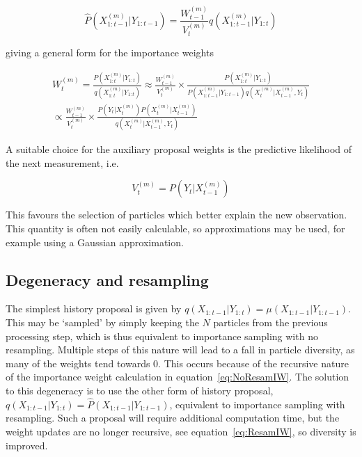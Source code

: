 \begin{equation}
\hat{P}(X_{1:t-1}^{(m)}|Y_{1:t-1}) = \frac{W_{t-1}^{(m)}}{V_t^{(m)}} q(X_{1:t-1}^{(m)}|Y_{1:t})
\label{eq:}
\end{equation}

giving a general form for the importance weights

\begin{multline}
W_t^{(m)} = \frac{P(X_{1:t}^{(m)}|Y_{1:t})}{q(X_{1:t}^{(m)}|Y_{1:t})}
\approx \frac{W_{t-1}^{(m)}}{V_{t}^{(m)}} \times \frac{P(X_{1:t}^{(m)}|Y_{1:t})}{P(X_{1:t-1}^{(m)}|Y_{1:t-1}) q(X_{t}^{(m)}|X_{t-1}^{(m)}, Y_{t})}\\
\propto \frac{W_{t-1}^{(m)}}{V_{t}^{(m)}} \times \frac{ P(Y_t|X_t^{(m)})P(X_t^{(m)}|X_{t-1}^{(m)})}{q(X_t^{(m)}|X_{t-1}^{(m)}, Y_t)}
\label{eq:AuxiliaryIW}
\end{multline}

A suitable choice for the auxiliary proposal weights is the predictive likelihood of the next measurement, i.e.

\begin{equation}
V_t^{(m)} = P(Y_t|X_{t-1}^{(m)})
\label{eq:}
\end{equation}

This favours the selection of particles which better explain the new observation. This quantity is often not easily calculable, so approximations may be used, for example using a Gaussian approximation.



\subsection{Degeneracy and resampling}
The simplest history proposal is given by $q(X_{1:t-1}|Y_{1:t}) = \mu(X_{1:t-1}|Y_{1:t-1})$. This may be `sampled' by simply keeping the $N$ particles from the previous processing step, which is thus equivalent to importance sampling with no resampling. Multiple steps of this nature will lead to a fall in particle diversity, as many of the weights tend towards 0. This occurs because of the recursive nature of the importance weight calculation in equation~\ref{eq:NoResamIW}. The solution to this degeneracy is to use the other form of history proposal, $q(X_{1:t-1}|Y_{1:t}) = \hat{P}(X_{1:t-1}|Y_{1:t-1})$, equivalent to importance sampling with resampling. Such a proposal will require additional computation time, but the weight updates are no longer recursive, see equation~\ref{eq:ResamIW}, so diversity is improved.

